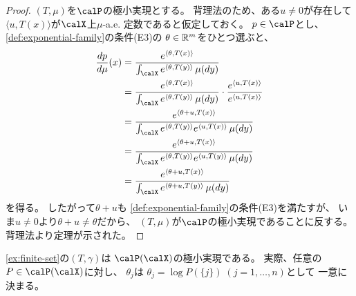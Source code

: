 \documentclass[report]{jlreq}
\begin{document}
\begin{proof}
    $(T, \mu)$を$\calP$の極小実現とする。
    背理法のため、ある$u \neq 0$が存在して
    $\langle u, T(x) \rangle$が$\calX$上$\mu$-a.e. 定数であると仮定しておく。
    $p \in \calP$とし、
    \cref{def:exponential-family}の条件(E3)の
    $\theta \in \mathbb{R}^m$をひとつ選ぶと、
    \begin{alignat}{1}
        \dd[p]{\mu}(x)
            &= \frac{
                e^{\langle \theta, T(x) \rangle}
            }{
                \int_{\calX} e^{\langle \theta, T(y) \rangle} \, \mu(dy)
            } \\
            &= \frac{
                e^{\langle \theta, T(x) \rangle}
            }{
                \int_{\calX} e^{\langle \theta, T(y) \rangle} \, \mu(dy)
            }
            \cdot \frac{
                e^{\langle u, T(x) \rangle}
            }{
                e^{\langle u, T(x) \rangle}
            } \\
            &= \frac{
                e^{\langle \theta + u, T(x) \rangle}
            }{
                \int_{\calX}
                e^{\langle \theta, T(y) \rangle}
                e^{\langle u, T(x) \rangle}
                \, \mu(dy)
            } \\
            &= \frac{
                e^{\langle \theta + u, T(x) \rangle}
            }{
                \int_{\calX}
                e^{\langle \theta, T(y) \rangle}
                e^{\langle u, T(y) \rangle}
                \, \mu(dy)
            } \\
            &= \frac{
                e^{\langle \theta + u, T(x) \rangle}
            }{
                \int_{\calX}
                e^{\langle \theta + u, T(y) \rangle}
                \, \mu(dy)
            }
    \end{alignat}
    を得る。
    したがって$\theta + u$も
    \cref{def:exponential-family}の条件(E3)を満たすが、
    いま$u \neq 0$より$\theta + u \neq \theta$だから、
    $(T, \mu)$が$\calP$の極小実現であることに反する。
    背理法より定理が示された。
\end{proof}

\begin{example}[有限集合上の確率分布族]
    \cref{ex:finite-set}の$(T, \gamma)$は
    $\calP(\calX)$の極小実現である。
    実際、任意の$P \in \calP(\calX)$に対し、
    $\theta_j$は
    $\theta_j = \log P(\{ j \}) \; (j = 1, \dots, n)$として
    一意に決まる。
\end{example}

\end{document}
